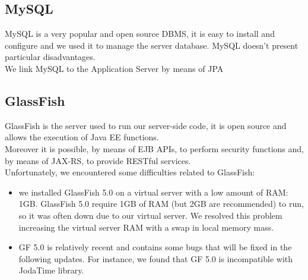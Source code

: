 \subsection{MySQL}
\label{subsec:Middleware}
MySQL is a very popular and open source DBMS, it is easy to install and configure and we used it to manage the server database. MySQL doesn't present particular disadvantages.\\
We link MySQL to the Application Server by means of JPA
\subsection{GlassFish}
\label{subsec:GlassFish}
GlassFish is the server used to run our server-side code, it is open source and allows the execution of Java EE functions.\\
Moreover it is possible, by means of EJB APIs, to perform security functions and, by means of JAX-RS, to provide RESTful services. \\
Unfortunately, we encountered some difficulties related to GlassFish:
\begin{itemize}
\item we installed GlassFish 5.0 on a virtual server with a low amount of RAM: 1GB. GlassFish 5.0 require 1GB of RAM (but 2GB are recommended) to run, so it was often down due to our virtual server. We resolved this problem increasing the virtual server RAM with a swap in local memory mass.
\item GF 5.0 is relatively recent and contains some bugs that will be fixed in the following updates. For instance, we found that GF 5.0 is incompatible with JodaTime library. 
\end{itemize}